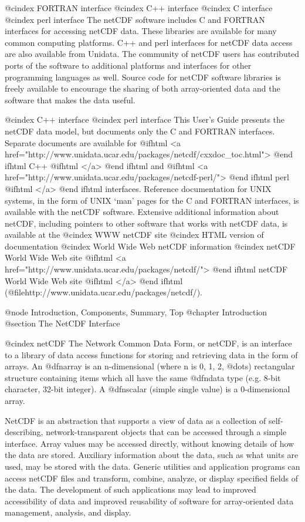 @cindex FORTRAN interface
@cindex C++ interface
@cindex C interface
@cindex perl interface
The netCDF software includes C and FORTRAN interfaces for accessing
netCDF data.  These libraries are available for many common computing
platforms.  
C++
and 
perl 
interfaces for netCDF data access are also
available from Unidata.  The community of netCDF users has contributed
ports of the software to additional platforms and interfaces for other
programming languages as well.  Source code for netCDF software
libraries is freely available to encourage the sharing of both
array-oriented data and the software that makes the data useful.

@cindex C++ interface
@cindex perl interface
This User's Guide presents the netCDF data model, but documents only the
C and FORTRAN interfaces.  Separate documents are
available for 
@ifhtml
<a href="http://www.unidata.ucar.edu/packages/netcdf/cxxdoc_toc.html">
@end ifhtml
C++
@ifhtml
</a>
@end ifhtml
and 
@ifhtml
<a href="http://www.unidata.ucar.edu/packages/netcdf-perl/">
@end ifhtml
perl 
@ifhtml
</a>
@end ifhtml
interfaces.  Reference documentation for UNIX
systems, in the form of UNIX `man' pages for the C and FORTRAN
interfaces, is available with the netCDF software.  Extensive
additional information about netCDF, including pointers to other
software that works with netCDF data, is available at the
@cindex WWW netCDF site
@cindex HTML version of documentation
@cindex World Wide Web netCDF information
@cindex netCDF World Wide Web site
@ifhtml
<a href="http://www.unidata.ucar.edu/packages/netcdf/">
@end ifhtml
netCDF World Wide Web site
@ifhtml
</a>
@end ifhtml
(@file{http://www.unidata.ucar.edu/packages/netcdf/}).

@node Introduction, Components, Summary, Top
@chapter Introduction
@section The NetCDF Interface

@cindex netCDF
The Network Common Data Form, or netCDF, is an interface to a library of
data access functions for storing and retrieving data in the form of arrays.
An @dfn{array} is an n-dimensional (where n is 0, 1, 2, @dots{}) rectangular
structure containing items which all have the same @dfn{data type}
(e.g. 8-bit character, 32-bit integer).
A @dfn{scalar} (simple single value) is a 0-dimensional array.

NetCDF is an abstraction that supports a view of data as a collection of
self-describing, network-transparent objects that can be accessed
through a simple interface.  Array values
may be accessed directly, without knowing details of how the
data are stored.  Auxiliary information about the data, such as what
units are used, may be stored with the data.  Generic utilities and
application programs can access netCDF files
and transform, combine, analyze, or display specified fields of the
data.  The development of such applications may lead to improved
accessibility of data and improved reusability of software for
array-oriented data management, analysis, and display.

